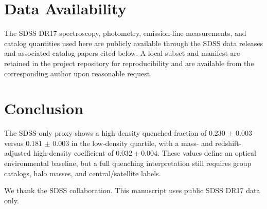 \documentclass[twocolumn]{aastex631}
\begin{document}
\section{Data Availability}\label{sec:data-avail}
The SDSS DR17 spectroscopy, photometry, emission-line measurements, and catalog quantities used here are publicly available through the SDSS data releases and associated catalog papers cited below. A local subset and manifest are retained in the project repository for reproducibility and are available from the corresponding author upon reasonable request.

\section{Conclusion}\label{sec:conclusion}
The SDSS-only proxy shows a high-density quenched fraction of 0.230 $\pm$ 0.003 versus 0.181 $\pm$ 0.003 in the low-density quartile, with a mass- and redshift-adjusted high-density coefficient of $0.032 \pm 0.004$. These values define an optical environmental baseline, but a full quenching interpretation still requires group catalogs, halo masses, and central/satellite labels.

\acknowledgments
We thank the SDSS collaboration. This manuscript uses public SDSS DR17 data only.
\end{document}
